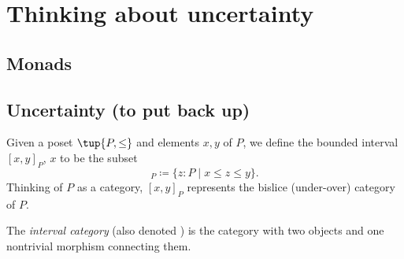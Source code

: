 \section{Thinking about uncertainty}
\subsection{Monads}
\subsection{Uncertainty (to put back up)}

\begin{definition}
Given a poset $ \tup{P, \leq}$ and elements $x,y$ of $P$, we define the bounded interval $[x,y]_P$, $x$ to be the subset
\begin{equation}
    [x,y]_P\coloneqq \{z\colon P \mid x\leq z \leq y\}.
\end{equation}
Thinking of $P$ as a category, $[x,y]_P$ represents the bislice (under-over) category of $P$.
\end{definition}

\begin{definition}
The \emph{interval category} (also denoted ) is the category with two objects and one nontrivial morphism connecting them.
\end{definition}

